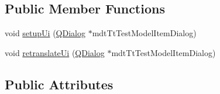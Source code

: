\subsection*{Public Member Functions}
\begin{DoxyCompactItemize}
\item 
void \hyperlink{class_ui__mdt_tt_test_model_item_dialog_a529b5da0d5786cf02dbfad246b68e1ee}{setup\-Ui} (\hyperlink{class_q_dialog}{Q\-Dialog} $\ast$mdt\-Tt\-Test\-Model\-Item\-Dialog)
\item 
void \hyperlink{class_ui__mdt_tt_test_model_item_dialog_a940beb39b077aea45015cb76d833113f}{retranslate\-Ui} (\hyperlink{class_q_dialog}{Q\-Dialog} $\ast$mdt\-Tt\-Test\-Model\-Item\-Dialog)
\end{DoxyCompactItemize}
\subsection*{Public Attributes}

